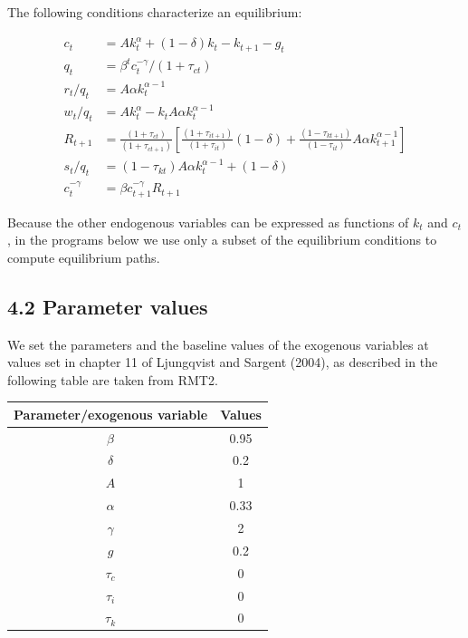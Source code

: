 \documentclass[10pt]{article}
\begin{document}
The following conditions characterize an equilibrium:


\begin{align*}
c_{t} & =A k_{t}^{\alpha}+(1-\delta) k_{t}-k_{t+1}-g_{t}  \tag{7}\\
q_{t} & =\beta^{t} c_{t}^{-\gamma} /\left(1+\tau_{c t}\right)  \tag{8}\\
r_{t} / q_{t} & =A \alpha k_{t}^{\alpha-1}  \tag{9}\\
w_{t} / q_{t} & =A k_{t}^{\alpha}-k_{t} A \alpha k_{t}^{\alpha-1}  \tag{10}\\
R_{t+1} & =\frac{\left(1+\tau_{c t}\right)}{\left(1+\tau_{c t+1}\right)}\left[\frac{\left(1+\tau_{i t+1}\right)}{\left(1+\tau_{i t}\right)}(1-\delta)+\frac{\left(1-\tau_{k t+1}\right)}{\left(1-\tau_{i t}\right)} A \alpha k_{t+1}^{\alpha-1}\right]  \tag{11}\\
s_{t} / q_{t} & =\left(1-\tau_{k t}\right) A \alpha k_{t}^{\alpha-1}+(1-\delta)  \tag{12}\\
c_{t}^{-\gamma} & =\beta c_{t+1}^{-\gamma} R_{t+1} \tag{13}
\end{align*}


Because the other endogenous variables can be expressed as functions of $k_{t}$ and $c_{t}$, in the programs below we use only a subset of the equilibrium conditions to compute equilibrium paths.

\subsection*{4.2 Parameter values}
We set the parameters and the baseline values of the exogenous variables at values set in chapter 11 of Ljungqvist and Sargent (2004), as described in the following table are taken from RMT2.

\begin{center}
\begin{tabular}{cc}
\hline
Parameter/exogenous variable & Values \\
\hline
$\beta$ & 0.95 \\
$\delta$ & 0.2 \\
$A$ & 1 \\
$\alpha$ & 0.33 \\
$\gamma$ & 2 \\
$g$ & 0.2 \\
$\tau_{c}$ & 0 \\
$\tau_{i}$ & 0 \\
$\tau_{k}$ & 0 \\
\hline
\end{tabular}
\end{center}
\end{document}
